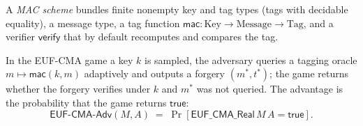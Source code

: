 \begin{definition}
  \label{def:macscheme}
  \leanok
  A \emph{MAC scheme} bundles finite nonempty key and tag types (tags with decidable
  equality), a message type, a tag function $\mathsf{mac} : \mathrm{Key} \to \mathrm{Message} \to \mathrm{Tag}$,
  and a verifier $\mathsf{verify}$ that by default recomputes and compares the tag.
\end{definition}

\begin{definition}
  \label{def:eufcma-adv}
  \leanok
  In the EUF-CMA game a key $k$ is sampled, the adversary queries a tagging
  oracle $m \mapsto \mathsf{mac}(k, m)$ adaptively and outputs a forgery
  $(m^{*}, t^{*})$; the game returns whether the forgery verifies under $k$ and
  $m^{*}$ was not queried. The advantage is the probability that the game
  returns $\mathsf{true}$:
  \[
    \mathsf{EUF\text{-}CMA\text{-}Adv}(M, A)
      \;=\; \Pr[\mathsf{EUF\_CMA\_Real}\,M\,A = \mathsf{true}].
  \]
\end{definition}
